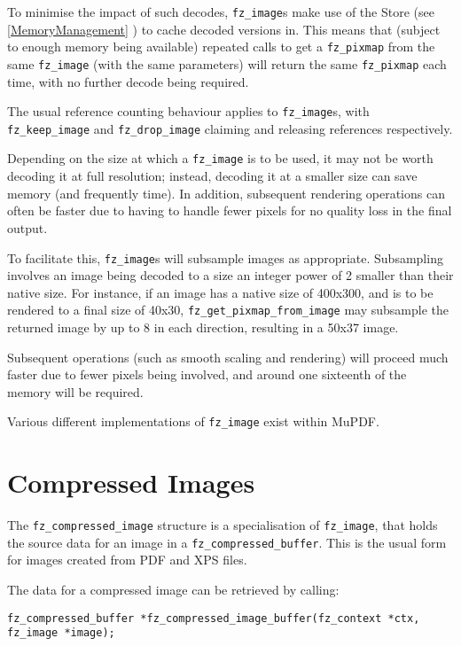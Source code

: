 \documentclass[oneside]{book}
\newcommand{\rjwref}[1] {\autoref{#1} \nameref{#1}}
\begin{document}
To minimise the impact of such decodes, \texttt{fz\_image}s make use of the Store (see \rjwref{MemoryManagement}) to cache decoded versions in.  This means that (subject to enough memory being available) repeated calls to get a \texttt{fz\_pixmap} from the same \texttt{fz\_image} (with the same parameters) will return the same \texttt{fz\_pixmap} each time, with no further decode being required.

The usual reference counting behaviour applies to \texttt{fz\_image}s, with \texttt{fz\_keep\_image} and \texttt{fz\_drop\_image} claiming and releasing references respectively.

Depending on the size at which a \texttt{fz\_image} is to be used, it may not be worth decoding it at full resolution; instead, decoding it at a smaller size can save memory (and frequently time). In addition, subsequent rendering operations can often be faster due to having to handle fewer pixels for no quality loss in the final output.

To facilitate this, \texttt{fz\_image}s will subsample images as appropriate. Subsampling involves an image being decoded to a size an integer power of 2 smaller than their native size. For instance, if an image has a native size of 400x300, and is to be rendered to a final size of 40x30, \texttt{fz\_get\_pixmap\_from\_image} may subsample the returned image by up to 8 in each direction, resulting in a 50x37 image.

Subsequent operations (such as smooth scaling and rendering) will proceed much faster due to fewer pixels being involved, and around one sixteenth of the memory will be required.

Various different implementations of \texttt{fz\_image} exist within MuPDF.

\section{Compressed Images}

The \texttt{fz\_compressed\_image} structure is a specialisation of \texttt{fz\_image}, that holds the source data for an image in a \texttt{fz\_compressed\_buffer}. This is the usual form for images created from PDF and XPS files.

The data for a compressed image can be retrieved by calling:

\begin{lstlisting}
fz_compressed_buffer *fz_compressed_image_buffer(fz_context *ctx, fz_image *image);
\end{lstlisting}
\end{document}
